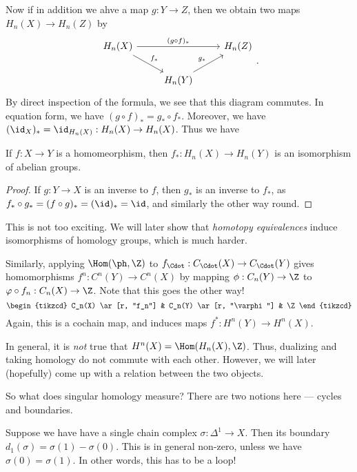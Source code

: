 \documentclass[a4paper]{article}
\begin{document}
Now if in addition we ahve a map $g: Y \to Z$, then we obtain two maps $H_n(X) \to H_n(Z)$ by
\[
  \begin{tikzcd}
    H_n(X) \ar[rr, "(g \circ f)_*"] \ar[rd, "f_*"] & & H_n(Z)\\
    & H_n(Y) \ar[ru, "g_*"]
  \end{tikzcd}.
\]
By direct inspection of the formula, we see that this diagram commutes. In equation form, we have $(g \circ f)_* = g_* \circ f_*$. Moreover, we have $(\id_X)_* = \id_{H_n(X)}: H_n(X) \to H_n(X)$. Thus we have
\begin{prop}
  If $f: X \to Y$ is a homomeorphism, then $f_*: H_n(X) \to H_n(Y)$ is an isomorphism of abelian groups.
\end{prop}

\begin{proof}
  If $g: Y \to X$ is an inverse to $f$, then $g_*$ is an inverse to $f_*$, as $f_* \circ g_* = (f \circ g)_* = (\id)_* = \id$, and similarly the other way round.
\end{proof}
This is not too exciting. We will later show that \emph{homotopy equivalences} induce isomorphisms of homology groups, which is much harder.

Similarly, applying $\Hom(\ph, \Z)$ to $f_{\Cdot}: C_{\Cdot}(X) \to C_{\Cdot}(Y)$ gives homomorphisms $f^n: C^n(Y) \to C^n(X)$ by mapping $\phi: C_n(Y) \to \Z$ to $\varphi \circ f_n: C_n(X) \to \Z$. Note that this goes the other way!
\[
  \begin{tikzcd}
     C_n(X) \ar[r, "f_n"] & C_n(Y) \ar[r, "\varphi"] & \Z
  \end{tikzcd}
\]
Again, this is a cochain map, and induces maps $f^*: H^n(Y) \to H^n(X)$.

\begin{fact}
  In general, it is \emph{not} true that $H^n(X) = \Hom(H_n(X), \Z)$. Thus, dualizing and taking homology do not commute with each other. However, we will later (hopefully) come up with a relation between the two objects.
\end{fact}

So what does singular homology measure? There are two notions here --- cycles and boundaries.

Suppose we have have a single chain complex $\sigma: \Delta^1 \to X$. Then its boundary $d_1(\sigma) = \sigma(1) - \sigma(0)$. This is in general non-zero, unless we have $\sigma(0) = \sigma(1)$. In other words, this has to be a loop!

\end{document}
